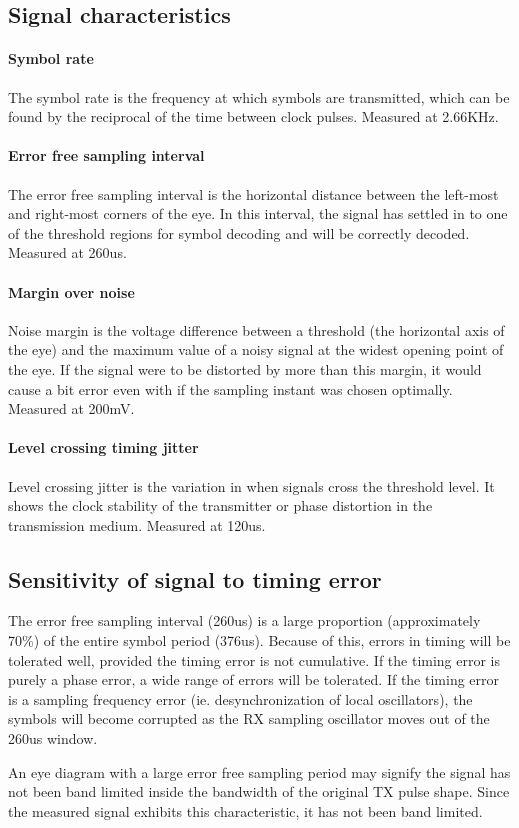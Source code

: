 \documentclass[11pt]{article}
\begin{document}
\subsection{Signal characteristics}
\paragraph{Symbol rate}
The symbol rate is the frequency at which symbols are transmitted, which can be
found by the reciprocal of the time between clock pulses. Measured at 2.66KHz.
\paragraph{Error free sampling interval}
The error free sampling interval is the horizontal distance between the
left-most and right-most corners of the eye. In this interval, the signal has
settled in to one of the threshold regions for symbol decoding and will be
correctly decoded. Measured at 260us.
\paragraph{Margin over noise}
Noise margin is the voltage difference between a threshold (the horizontal axis
of the eye) and the maximum value of a noisy signal at the widest opening point
of the eye. If the signal were to be distorted by more than this margin, it
would cause a bit error even with if the sampling instant was chosen optimally.
Measured at 200mV.
\paragraph{Level crossing timing jitter}
Level crossing jitter is the variation in when signals cross the threshold
level. It shows the clock stability of the transmitter or phase distortion in
the transmission medium. Measured at 120us.

\subsection{Sensitivity of signal to timing error}
The error free sampling interval (260us) is a large proportion (approximately
70\%) of the entire symbol period (376us). Because of this, errors in timing
will be tolerated well, provided the timing error is not cumulative. If the
timing error is purely a phase error, a wide range of errors will be tolerated.
If the timing error is a sampling frequency error (ie. desynchronization of
local oscillators), the symbols will become corrupted as the RX sampling
oscillator moves out of the 260us window.

An eye diagram with a large error free sampling period may signify the signal
has not been band limited inside the bandwidth of the original TX pulse shape.
Since the measured signal exhibits this characteristic, it has not been band
limited.
\end{document}
